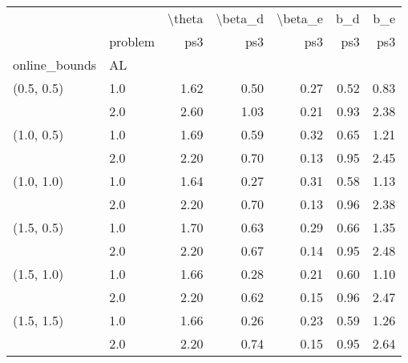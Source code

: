 \begin{tabular}{llrrrrr}
\toprule
           & {} & \textbackslash theta & \textbackslash beta\_d & \textbackslash beta\_e &  b\_d &  b\_e \\
           & problem &    ps3 &     ps3 &     ps3 &  ps3 &  ps3 \\
online\_bounds & AL &        &         &         &      &      \\
\midrule
(0.5, 0.5) & 1.0 &   1.62 &    0.50 &    0.27 & 0.52 & 0.83 \\
           & 2.0 &   2.60 &    1.03 &    0.21 & 0.93 & 2.38 \\
(1.0, 0.5) & 1.0 &   1.69 &    0.59 &    0.32 & 0.65 & 1.21 \\
           & 2.0 &   2.20 &    0.70 &    0.13 & 0.95 & 2.45 \\
(1.0, 1.0) & 1.0 &   1.64 &    0.27 &    0.31 & 0.58 & 1.13 \\
           & 2.0 &   2.20 &    0.70 &    0.13 & 0.96 & 2.38 \\
(1.5, 0.5) & 1.0 &   1.70 &    0.63 &    0.29 & 0.66 & 1.35 \\
           & 2.0 &   2.20 &    0.67 &    0.14 & 0.95 & 2.48 \\
(1.5, 1.0) & 1.0 &   1.66 &    0.28 &    0.21 & 0.60 & 1.10 \\
           & 2.0 &   2.20 &    0.62 &    0.15 & 0.96 & 2.47 \\
(1.5, 1.5) & 1.0 &   1.66 &    0.26 &    0.23 & 0.59 & 1.26 \\
           & 2.0 &   2.20 &    0.74 &    0.15 & 0.95 & 2.64 \\
\bottomrule
\end{tabular}
